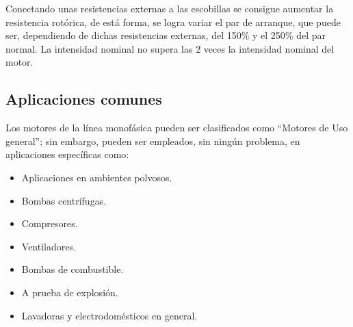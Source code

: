 \documentclass[a4paper,12pt]{article}
\begin{document}
Conectando unas resistencias externas a las escobillas se consigue aumentar la resistencia rotórica, de está forma, se logra variar el par de arranque, que puede ser, dependiendo de dichas resistencias externas, del 150\% y el 250\% del par normal. La intensidad nominal no supera las 2 veces la intensidad nominal del motor.
\subsection{Aplicaciones comunes}
Los motores de la línea monofásica pueden ser clasificados como ``Motores de Uso general''; sin embargo, pueden ser empleados, sin ningún problema, en aplicaciones específicas como:
\begin{itemize}
    \item Aplicaciones en ambientes polvosos.
    \item Bombas centrífugas.
    \item Compresores.
    \item Ventiladores.
    \item Bombas de combustible.
    \item A prueba de explosión.
    \item Lavadoras y electrodomésticos en general.
\end{itemize}
\newpage
\end{document}
